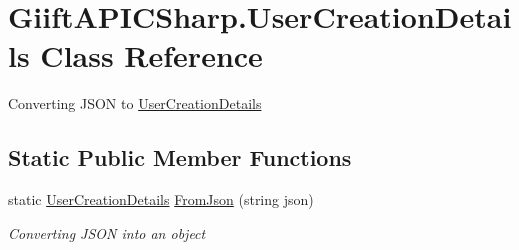 \hypertarget{class_giift_a_p_i_c_sharp_1_1_user_creation_details}{}\section{Giift\+A\+P\+I\+C\+Sharp.\+User\+Creation\+Details Class Reference}
\label{class_giift_a_p_i_c_sharp_1_1_user_creation_details}


Converting J\+S\+ON to \hyperlink{class_giift_a_p_i_c_sharp_1_1_user_creation_details}{User\+Creation\+Details}  


\subsection*{Static Public Member Functions}
\begin{DoxyCompactItemize}
\item 
static \hyperlink{class_giift_a_p_i_c_sharp_1_1_user_creation_details}{User\+Creation\+Details} \hyperlink{class_giift_a_p_i_c_sharp_1_1_user_creation_details_abe2abcceb4d98d3839288d1013c77d65}{From\+Json} (string json)
\begin{DoxyCompactList}\small\item\em Converting J\+S\+ON into an object \end{DoxyCompactList}\end{DoxyCompactItemize}
